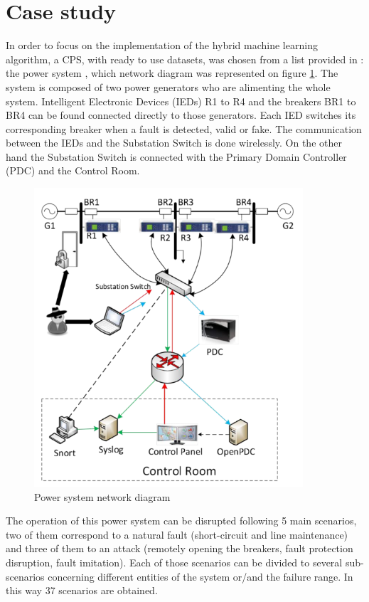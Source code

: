 \section{Case study}
In order to focus on the implementation of the hybrid machine learning algorithm, a CPS, with ready to use datasets, was chosen from a list provided in \cite{morris_industrial_nodate}: the power system \cite{adhikari_power_2014}, which network diagram was represented on figure \ref{fig:cps_rep}. The system is composed of two power generators who are alimenting the whole system. Intelligent Electronic Devices (IEDs) R1 to R4 and the breakers BR1 to BR4 can be found connected directly to those generators. Each IED switches its corresponding breaker when a fault is detected, valid or fake. The communication between the IEDs and the Substation Switch is done wirelessly. On the other hand the Substation Switch is connected with the Primary Domain Controller (PDC) and the Control Room.

\begin{figure}[H]
    \centering
    \includegraphics[width=100mm]{images/cps_rep.png}
    \caption[Power system network diagram]{Power system network diagram \cite{adhikari_power_2014}}
    \label{fig:cps_rep}
\end{figure}

The operation of this power system can be disrupted following 5 main scenarios, two of them correspond to a natural fault (short-circuit and line maintenance) and three of them to an attack (remotely opening the breakers, fault protection disruption, fault imitation). Each of those scenarios can be divided to several sub-scenarios concerning different entities of the system or/and the failure range. In this way 37 scenarios are obtained.

